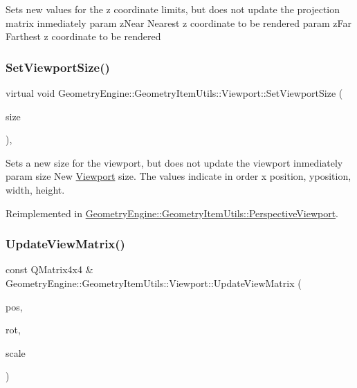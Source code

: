 Sets new values for the z coordinate limits, but does not update the projection matrix inmediately param z\+Near Nearest z coordinate to be rendered param z\+Far Farthest z coordinate to be rendered \mbox{\label{class_geometry_engine_1_1_geometry_item_utils_1_1_viewport_aee56ad377f9615e64c33bdef3d05c94f}} 
\subsubsection{\texorpdfstring{SetViewportSize()}{SetViewportSize()}}
{\footnotesize\ttfamily virtual void Geometry\+Engine\+::\+Geometry\+Item\+Utils\+::\+Viewport\+::\+Set\+Viewport\+Size (\begin{DoxyParamCaption}\item[{const Q\+Vector4D \&}]{size }\end{DoxyParamCaption})\hspace{0.3cm}{\ttfamily [inline]}, {\ttfamily [virtual]}}

Sets a new size for the viewport, but does not update the viewport inmediately param size New \mbox{\hyperlink{class_geometry_engine_1_1_geometry_item_utils_1_1_viewport}{Viewport}} size. The values indicate in order x position, yposition, width, height. 

Reimplemented in \mbox{\hyperlink{class_geometry_engine_1_1_geometry_item_utils_1_1_perspective_viewport_a01764cc11407ed9ce70111a627c823ae}{Geometry\+Engine\+::\+Geometry\+Item\+Utils\+::\+Perspective\+Viewport}}.

\mbox{\label{class_geometry_engine_1_1_geometry_item_utils_1_1_viewport_a3a6f1e8286670aa78e21631e6f3ca80b}} 
\subsubsection{\texorpdfstring{UpdateViewMatrix()}{UpdateViewMatrix()}}
{\footnotesize\ttfamily const Q\+Matrix4x4 \& Geometry\+Engine\+::\+Geometry\+Item\+Utils\+::\+Viewport\+::\+Update\+View\+Matrix (\begin{DoxyParamCaption}\item[{const Q\+Vector3D \&}]{pos,  }\item[{const Q\+Quaternion \&}]{rot,  }\item[{const Q\+Vector3D \&}]{scale }\end{DoxyParamCaption})\hspace{0.3cm}{\ttfamily [virtual]}}

